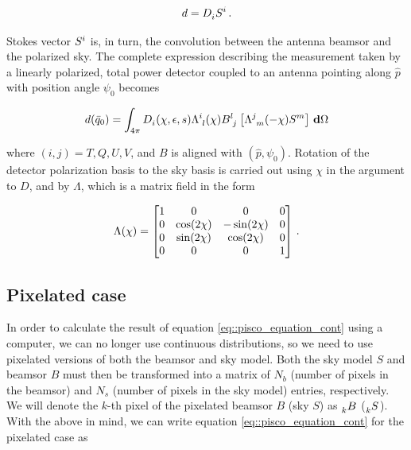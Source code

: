 \documentclass[a4paper,11pt]{article}
\begin{document}
\begin{equation}
\begin{aligned}
d = \tensor{D}{_{i}} \tensor{S}{^{i}} \, .
\end{aligned}
\label{eq::total_power_measurement}
\end{equation}

Stokes vector $\tensor{S}{^{i}}$ is, in turn, the convolution between the antenna beamsor and the polarized sky. The complete expression describing the measurement taken by a linearly polarized, total power detector coupled to an antenna pointing along $\hat{p}$ with position angle $\psi_0$ becomes

\begin{equation}
\begin{aligned}
d(\bar{q}_0) =  \int_{4\pi} \tensor{D}{_{i}}(\chi,\epsilon,s) \tensor{\Lambda}{^{i}_{l}}(\chi)  \tensor{B}{^{l}_{j} } \left[ \tensor{\Lambda}{^{j}_{m}}(-\chi) \tensor{S}{^{m}} \right ] \, \mathbf{d} \Omega 
\end{aligned}
\label{eq::pisco_equation_cont}
\end{equation}

\noindent
where $(i,j) = T,Q,U,V$, and $B$ is aligned with $(\hat{p},\psi_0)$. Rotation of the detector polarization basis to the sky basis is carried out using $\chi$ in the argument to $D$, and by $\Lambda$, which is a matrix field in the form

\begin{equation}
\begin{aligned}
\Lambda(\chi) =
\begin{bmatrix}
1  & 0 & 0 & 0\\
0  & \cos(2\chi) & -\sin(2\chi) & 0\\
0  &\sin(2\chi) & \cos(2\chi) & 0\\
0  & 0 & 0 & 1
\end{bmatrix}  \, \rm{.}
\end{aligned}
\label{eq::lambda_operator}
\end{equation}

\subsection{Pixelated case}
\label{sec::pixel_conv}

In order to calculate the result of equation \ref{eq::pisco_equation_cont} using a computer, we can no longer use continuous distributions, so we need to use pixelated versions of both the beamsor and sky model. Both the sky model $S$ and beamsor $B$ must then be transformed into a matrix of $N_b$ (number of pixels in the beamsor) and $N_s$ (number of pixels in the sky model) entries, respectively. We will denote the $k$-th pixel of the pixelated beamsor $B$ (sky $S$) as $\tensor[_k]{B}{}$ ($\tensor[_k]{S}{}$). With the above in mind, we can write equation \ref{eq::pisco_equation_cont} for the pixelated case as
\end{document}
